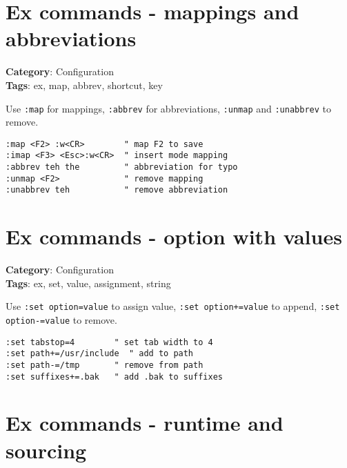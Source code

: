 {{{\section{Ex commands - mappings and abbreviations}

\textbf{Category}: Configuration\\ \textbf{Tags}: ex, map, abbrev, shortcut, key
\vspace{0.5cm}

Use {\footnotesize \Verb§:map§} for mappings, {\footnotesize \Verb§:abbrev§} for abbreviations, {\footnotesize \Verb§:unmap§} and {\footnotesize \Verb§:unabbrev§} to remove.

\begin{Exa*}{}
\begin{Verbatim}[fontsize=\footnotesize, breaklines, breakanywhere]
:map <F2> :w<CR>        " map F2 to save
:imap <F3> <Esc>:w<CR>  " insert mode mapping
:abbrev teh the         " abbreviation for typo
:unmap <F2>             " remove mapping
:unabbrev teh           " remove abbreviation
\end{Verbatim}
\end{Exa*}

\section{Ex commands - option with values}

\textbf{Category}: Configuration\\ \textbf{Tags}: ex, set, value, assignment, string
\vspace{0.5cm}

Use {\footnotesize \Verb§:set option=value§} to assign value, {\footnotesize \Verb§:set option+=value§} to append, {\footnotesize \Verb§:set option-=value§} to remove.

\begin{Exa*}{}
\begin{Verbatim}[fontsize=\footnotesize, breaklines, breakanywhere]
:set tabstop=4        " set tab width to 4
:set path+=/usr/include  " add to path
:set path-=/tmp       " remove from path
:set suffixes+=.bak   " add .bak to suffixes
\end{Verbatim}
\end{Exa*}

\section{Ex commands - runtime and sourcing}

}}}
